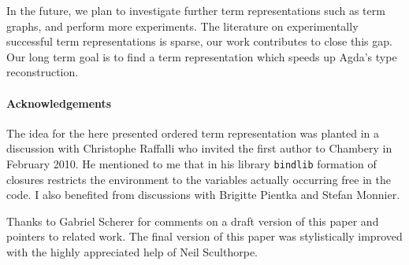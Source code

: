 \documentclass[submission,copyright,creativecommons]{eptcs}
\begin{document}
In the future, we plan to investigate further term representations
such as term graphs, and perform more experiments.  The literature on
experimentally successful term representations is sparse, our work
contributes to close this gap.  Our long term goal is to find a
term representation which speeds up Agda's type reconstruction.


\paragraph*{Acknowledgements}
The idea for the here presented ordered term representation was
planted in a discussion with Christophe Raffalli who invited the first
author to Chambery in February 2010.  He mentioned to me that in his
library \texttt{bindlib} formation of closures restricts the
environment to the variables actually occurring free in the code.  I
also benefited from discussions with Brigitte Pientka and Stefan Monnier.

Thanks to Gabriel Scherer for comments on a draft version of this
paper and pointers to related work. 
The final version of this paper was stylistically improved with the highly appreciated help of Neil Sculthorpe.





\end{document}
